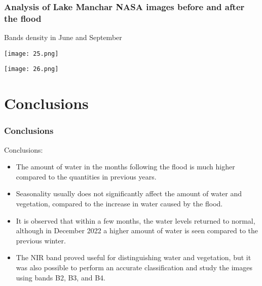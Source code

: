 \documentclass{beamer}
\begin{document}
\begin{frame}
  \frametitle{\small Analysis of Lake Manchar NASA images before and after the flood} 

  \centering\small Bands density in June and September
  \vspace{1cm}

   \begin{minipage}{0.48\textwidth}
    \centering
    \texttt{[image: 25.png]}
  \end{minipage}
  \hfill
  \begin{minipage}{0.48\textwidth}
    \centering
    \texttt{[image: 26.png]}
    \caption{}
  \end{minipage}

\end{frame}

\section{Conclusions}
\begin{frame}
  \frametitle{\small Conclusions}
  
    \small Conclusions:
    \begin{itemize}
        \item \small The amount of water in the months following the flood is much higher compared to the quantities in previous years. 
        \item \small Seasonality usually does not significantly affect the amount of water and vegetation, compared to the increase in water caused by the flood. 
        \item \small It is observed that within a few months, the water levels returned to normal, although in December 2022 a higher amount of water is seen compared to the previous winter. 
        \item \small The NIR band proved useful for distinguishing water and vegetation, but it was also possible to perform an accurate classification and study the images using bands B2, B3, and B4.
    \end{itemize}
  
\end{frame}
\end{document}
